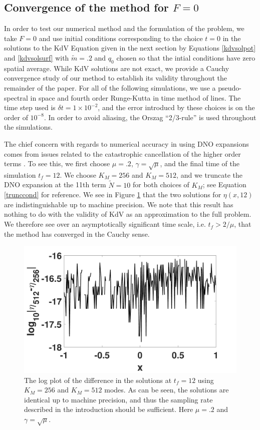 \documentclass[a4paper,11pt]{article}
\begin{document}
\subsection{Convergence of the method for $F=0$}

In order to test our numerical method and the formulation of the problem, we take $F=0$ and use initial conditions corresponding to the choice $t=0$ in the solutions to the KdV Equation given in the next section by Equations \eqref{kdvsolpot} and \eqref{kdvsolsurf} with $\tilde{m}=.2$ and $q_{0}$ chosen so that the intial conditions have zero spatial average.  While KdV solutions are not exact, we provide a Cauchy convergence study of our method to establish its validity throughout the remainder of the paper.  For all of the following simulations, we use a pseudo-spectral in space and fourth order Runge-Kutta in time method of lines.  The time step used is $\delta t = 1\times 10^{-2}$, and the error introducd by these choices is on the order of $10^{-8}$.  In order to avoid aliasing, the Orszag ``2/3-rule'' is used throughout the simulations. 

The chief concern with regards to numerical accuracy in using DNO expansions comes from issues related to the catastrophic cancellation of the higher order terms \cite{wilkening}. To see this, we first choose $\mu=.2$, $\gamma=\sqrt{\mu}$, and the final time of the simulation $t_{f}=12$.  We choose $K_{M}=256$ and $K_{M}=512$, and we truncate the DNO expansion at the 11th term $\tilde{N}=10$ for both choices of $K_{M}$; see Equation \eqref{trunccond} for reference.  We see in Figure \ref{fig:convcomp} that the two solutions for $\eta(x,12)$ are indistinguishable up to machine precision.  We note that this result has nothing to do with the validity of KdV as an approximation to the full problem.  We therefore see over an asymptotically significant time scale, i.e. $t_{f} > 2/\mu$, that the method has converged in the Cauchy sense.    
\begin{figure}[h]
\centering
\includegraphics[width=.48\textwidth]{conv_plot_tf_12}
\caption{The log plot of the difference in the solutions at $t_{f} = 12$ using $K_{M}=256$ and $K_{M}=512$ modes.  As can be seen, the solutions are identical up to machine precision, and thus the sampling rate described in the introduction should be sufficient.  Here $\mu=.2$ and $\gamma=\sqrt{\mu}$.}
\label{fig:convcomp}
\end{figure}
\end{document}
